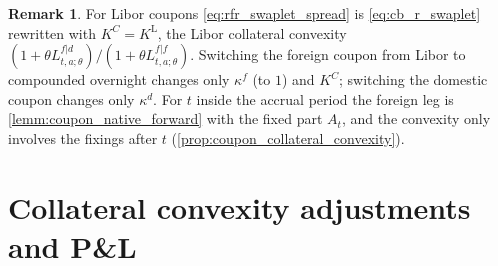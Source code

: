 \documentclass[11pt,english]{amsart}
\newcommand{\EE}{\mathbb{E}}
\newcommand{\Cov}{\mathrm{Cov}}
\newcommand{\Q}{\Xi}
\theoremstyle{definition}
\newtheorem{coro}{Corrolary}
\newtheorem{rema}{Remark}
\begin{document}
\begin{rema}
For Libor coupons \eqref{eq:rfr_swaplet_spread} is \eqref{eq:cb_r_swaplet} rewritten with $K^C = K^{\mathrm{L}}$, the Libor collateral convexity $(1+\theta L^{f|d}_{t,a;\theta})/(1+\theta L^{f|f}_{t,a;\theta})$. Switching the foreign coupon from Libor to compounded overnight changes only $\kappa^f$ (to $1$) and $K^C$; switching the domestic coupon changes only $\kappa^d$. For $t$ inside the accrual period the foreign leg is \autoref{lemm:coupon_native_forward} with the fixed part $A_t$, and the convexity only involves the fixings after $t$ (\autoref{prop:coupon_collateral_convexity}).
\end{rema}






\newpage%
\section{Collateral convexity adjustments and P\&L}




\end{document}

